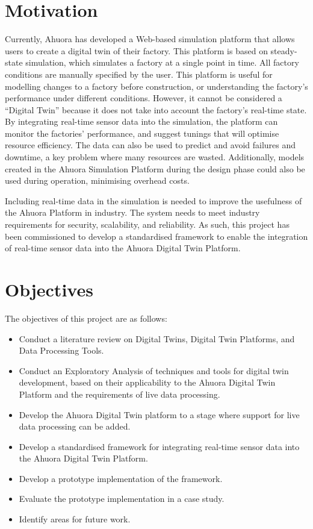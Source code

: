 \documentclass[12pt]{book}
\begin{document}
\section{Motivation}

Currently, Ahuora has developed a Web-based simulation platform that allows users to create a digital twin of their factory. 
This platform is based on steady-state simulation, which simulates a factory at a single point in time. All factory conditions are manually specified by the user.
This platform is useful for modelling changes to a factory before construction, or understanding the factory's performance under different conditions.
However, it cannot be considered a ``Digital Twin'' because it does not take into account the factory's real-time state.
By integrating real-time sensor data into the simulation, the platform can monitor the factories' performance, and suggest tunings that will optimise resource efficiency.
The data can also be used to predict and avoid failures and downtime, a key problem where many resources are wasted.
Additionally, models created in the Ahuora Simulation Platform during the design phase could also be used during operation, minimising overhead costs.

Including real-time data in the simulation is needed to improve the usefulness of the Ahuora Platform in industry. 
The system needs to meet industry requirements for security, scalability, and reliability. As such, this project 
has been commissioned to develop a standardised framework to enable the integration of real-time sensor data into the Ahuora Digital Twin Platform.

\section{Objectives}

The objectives of this project are as follows:
\begin{itemize}
    \item Conduct a literature review on Digital Twins, Digital Twin Platforms, and Data Processing Tools.
    \item Conduct an Exploratory Analysis of techniques and tools for digital twin development, based on their applicability to the Ahuora Digital Twin Platform and the requirements of live data processing.
    \item Develop the Ahuora Digital Twin platform to a stage where support for live data processing can be added.
    \item Develop a standardised framework for integrating real-time sensor data into the Ahuora Digital Twin Platform.
    \item Develop a prototype implementation of the framework.
    \item Evaluate the prototype implementation in a case study.
    \item Identify areas for future work.
\end{itemize}
\end{document}

